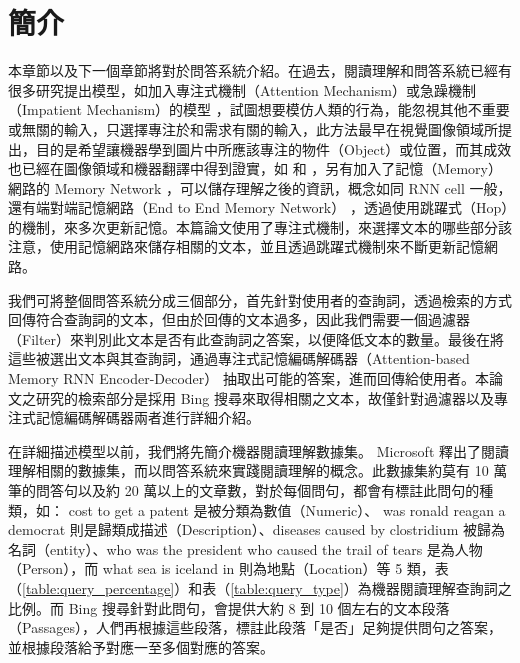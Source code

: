 \section{簡介}
本章節以及下一個章節將對於問答系統介紹。在過去，閱讀理解和問答系統已經有很多研究提出模型，如加入專注式機制（Attention Mechanism）或急躁機制（Impatient Mechanism）的模型 \cite{hermann2015teaching} ，試圖想要模仿人類的行為，能忽視其他不重要或無關的輸入，只選擇專注於和需求有關的輸入，此方法最早在視覺圖像領域所提出，目的是希望讓機器學到圖片中所應該專注的物件（Object）或位置，而其成效也已經在圖像領域和機器翻譯中得到證實，如 \cite{mnih2014recurrent} 和 \cite{bahdanau2014neural}，另有加入了記憶（Memory）網路的 Memory Network \cite{weston2014memory} ，可以儲存理解之後的資訊，概念如同 RNN cell 一般，還有端對端記憶網路（End to End Memory Network）\cite{sukhbaatar2015end} ，透過使用跳躍式（Hop）的機制，來多次更新記憶。本篇論文使用了專注式機制，來選擇文本的哪些部分該注意，使用記憶網路來儲存相關的文本，並且透過跳躍式機制來不斷更新記憶網路。

我們可將整個問答系統分成三個部分，首先針對使用者的查詢詞，透過檢索的方式回傳符合查詢詞的文本，但由於回傳的文本過多，因此我們需要一個過濾器（Filter）來判別此文本是否有此查詢詞之答案，以便降低文本的數量。最後在將這些被選出文本與其查詢詞，通過專注式記憶編碼解碼器（Attention-based Memory RNN Encoder-Decoder）\cite{xiong2016dynamic} 抽取出可能的答案，進而回傳給使用者。本論文之研究的檢索部分是採用 Bing 搜尋來取得相關之文本，故僅針對過濾器以及專注式記憶編碼解碼器兩者進行詳細介紹。

在詳細描述模型以前，我們將先簡介機器閱讀理解數據集。 Microsoft 釋出了閱讀理解相關的數據集，而以問答系統來實踐閱讀理解的概念。此數據集約莫有 10 萬筆的問答句以及約 20 萬以上的文章數，對於每個問句，都會有標註此問句的種類，如： cost to get a patent 是被分類為數值（Numeric）、 was ronald reagan a democrat 則是歸類成描述（Description）、diseases caused by clostridium 被歸為名詞（entity）、who was the president who caused the trail of tears 是為人物（Person），而 what sea is iceland in 則為地點（Location）等 5 類，表（\ref{table:query_percentage}）和表（\ref{table:query_type}）為機器閱讀理解查詢詞之比例。而 Bing 搜尋針對此問句，會提供大約 8 到 10 個左右的文本段落（Passages），人們再根據這些段落，標註此段落「是否」足夠提供問句之答案，並根據段落給予對應一至多個對應的答案。

